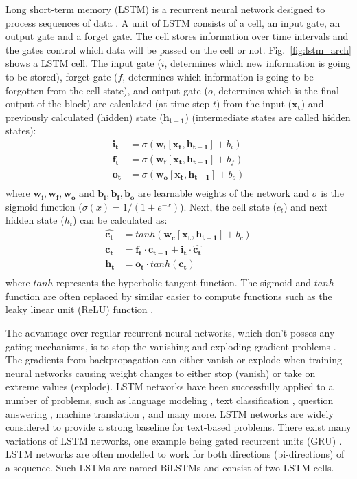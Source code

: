 Long short-term memory (LSTM) is a recurrent neural network
designed to process sequences of data 
\citep{gers1999learning}. A unit of LSTM consists of 
a cell, an input gate, an output gate and a forget gate.
The cell stores information over time intervals and the
gates control which data will be passed on the cell 
or not. Fig.~\ref{fig:lstm_arch} shows a LSTM cell.
The input gate ($i$, determines which new information is going to be stored), 
forget gate ($f$, determines which information is going to be forgotten from 
the cell state), and output gate ($o$, determines which is the final output 
of the block) 
are calculated (at time step $t$) from the input ($\mathbf{x_t}$) and 
previously calculated (hidden) state ($\mathbf{h_{t-1}}$) (intermediate states are 
called hidden states):
\begin{align*}
	\mathbf{i_t} &= \sigma(\mathbf{w_i} [\mathbf{x_t}, \mathbf{h_{t - 1}}] + b_i) \\
	\mathbf{f_t} &= \sigma(\mathbf{w_f} [\mathbf{x_t}, \mathbf{h_{t - 1}}] + b_f) \\
	\mathbf{o_t} &= \sigma(\mathbf{w_o} [\mathbf{x_t}, \mathbf{h_{t - 1}}] + b_o) \\
\end{align*}
where $\mathbf{w_i, w_f, w_o}$ and $\mathbf{b_i, b_f, b_o}$
are learnable weights of the network and $\sigma$ is the 
sigmoid function ($\sigma(x) = 1 / (1 + e^{-x})$). Next, the 
cell state ($c_t$) and next hidden state ($h_t$) can be calculated as:
\begin{align*}
	\mathbf{\hat{c_t}} &= tanh(\mathbf{w_c} [\mathbf{x_t}, \mathbf{h_{t - 1}}] + b_c) \\
	\mathbf{c_t} &= \mathbf{f_t} \cdot \mathbf{c_{t - 1}} + \mathbf{i_t} \cdot \mathbf{\hat{c_t}} \\
	\mathbf{h_t} &= \mathbf{o_t} \cdot \mathit{tanh}(\mathbf{c_t}) \\
\end{align*}
where $\mathit{tanh}$ represents the hyperbolic tangent function. The sigmoid
and $\mathit{tanh}$ function are often replaced by similar easier to compute functions 
such as the leaky linear unit (ReLU) function \citep{agostinelli2014learning}. 

The advantage over regular recurrent neural networks, which don't posses any
gating mechanisms, is to stop the vanishing \citep{hochreiter1998vanishing} and
exploding gradient problems \citep{pascanu2012understanding}.  The gradients
from backpropagation can either vanish or explode when training neural networks
causing weight changes to either stop (vanish) or take on extreme values
(explode). LSTM networks have been successfully applied to a number of
problems, such as language modeling \citep{sundermeyer2012lstm}, text
classification \citep{zhou2015c}, question answering \citep{zhu2016visual7w},
machine translation \citep{luong2014addressing}, and many more. LSTM networks
are widely considered to provide a strong baseline for text-based problems.
There exist many variations of LSTM networks, one example being gated recurrent
units (GRU) \citep{chung2014empirical}. LSTM networks are often modelled to 
work for both directions (bi-directions) of a sequence. Such LSTMs are named  
BiLSTMs and consist of two LSTM cells. 

